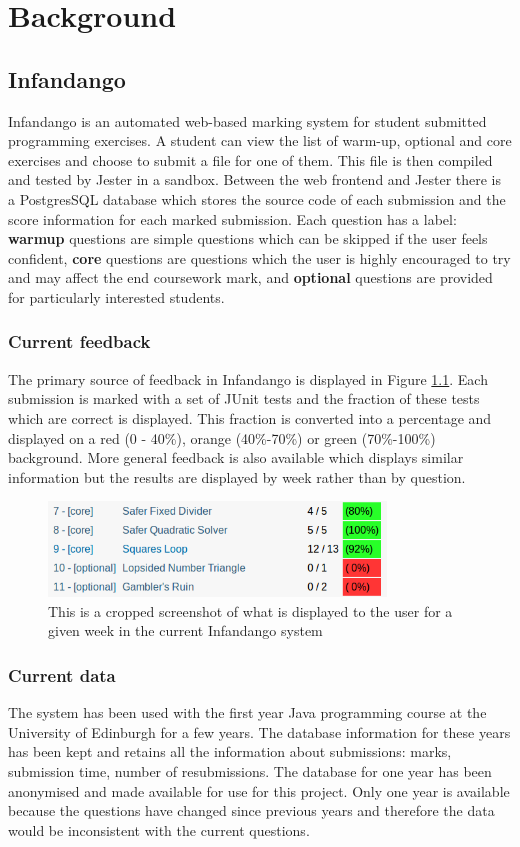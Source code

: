 \chapter{Background}
\label{background}
\section{Infandango}
Infandango is an automated web-based marking system for student submitted programming exercises. A student can view the list of warm-up, optional and core exercises and choose to submit a file for one of them. This file is then compiled and tested by Jester in a sandbox. Between the web frontend and Jester there is a PostgresSQL database which stores the source code of each submission and the score information for each marked submission.
Each question has a label: {\bf warmup} questions are simple questions which can be skipped if the user feels confident, {\bf core} questions are questions which the user is highly encouraged to try and may affect the end coursework mark, and {\bf optional} questions are provided for particularly interested students.
\subsection{Current feedback}
The primary source of feedback in Infandango is displayed in Figure \ref{fig:currentfeedback}. Each submission is marked with a set of JUnit tests and the fraction of these tests which are correct is displayed. This fraction is converted into a percentage and displayed on a red (0 - 40\%), orange (40\%-70\%) or green (70\%-100\%) background.
More general feedback is also available which displays similar information but the results are displayed by week rather than by question. 

\begin{figure}[h!]
\centering
\includegraphics[width=0.8\textwidth]{images/currentfeedback.png}
\caption{This is a cropped screenshot of what is displayed to the user for a given week in the current Infandango system}
\label{fig:currentfeedback}
\end{figure}

\subsection{Current data}
The system has been used with the first year Java programming course at the University of Edinburgh for a few years. The database information for these years has been kept and retains all the information about submissions: marks, submission time, number of resubmissions. The database for one year has been anonymised and made available for use for this project. Only one year is available because the questions have changed since previous years and therefore the data would be inconsistent with the current questions.

